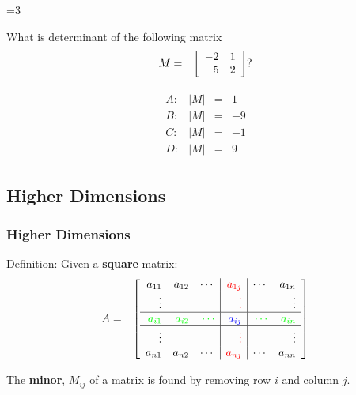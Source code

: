 {\begin{frame}
{          \vfill


     }\fi

      \ifnum\value{clickerQuiz}=3{%
        \vfill
      What is determinant of the following matrix
        \begin{eqnarray*}
          M & = & \left[ \begin{array}{rr} -2 & 1 \\ 5 & 2 \end{array} \right]?
        \end{eqnarray*}

        \begin{eqnarray*}
          \begin{array}{llcr}
            A: & |M| &  = &  1 \\
            B: & |M| &  = & -9 \\
            C: & |M| &  = &  -1 \\
            D: & |M| &  = & 9
          \end{array}
        \end{eqnarray*}

          \vfill


     }\fi

    \vfill
    \vfill
    \vfill

\end{frame}

}



\subsection{Higher Dimensions}

\begin{frame}
  \frametitle{Higher Dimensions}

  Definition: Given a \textbf{square} matrix:
  \begin{eqnarray*}
    A & = &
    \left[
      \begin{array}{rrr|r|rr}
        a_{11} & a_{12} & \cdots & {\color{red}a_{1j}}  & \cdots & a_{1n} \\
        \vdots &       &       & {\color{red}\vdots} &        & \vdots \\ \hline
        {\color{green}a_{i1}} & {\color{green}a_{i2}}  & {\color{green}\cdots} & {\color{blue}a_{ij}} & {\color{green}\cdots} & {\color{green}a_{in}} \\ \hline
        \vdots &       &       & {\color{red}\vdots} &        & \vdots \\
        a_{n1} & a_{n2} & \cdots & {\color{red}a_{nj}}  & \cdots & a_{nn} \\
      \end{array}
    \right]
  \end{eqnarray*}

  The \textbf{minor}, $M_{ij}$ of a matrix is found by removing row
  $i$ and column $j$.

\end{frame}


